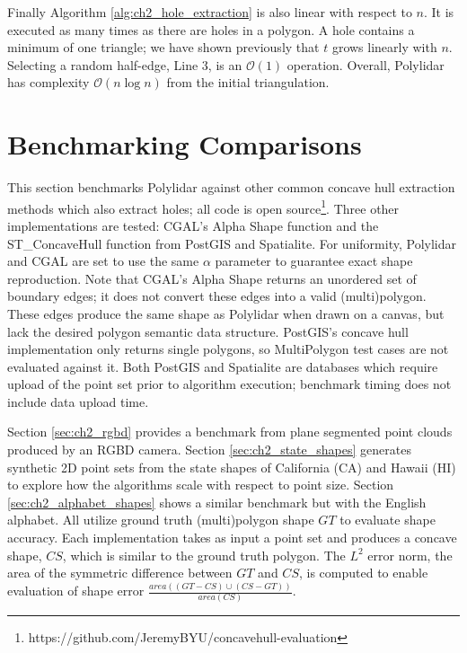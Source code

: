 Finally Algorithm \ref{alg:ch2_hole_extraction} is also linear with respect to $n$. It is executed as many times as there are holes in a polygon. A hole contains a minimum of one triangle; we have shown previously that $t$ grows linearly with $n$. Selecting a random half-edge, Line 3, is an $\mathcal{O}(1)$ operation. Overall, Polylidar has complexity $\mathcal{O}(n\log{}n)$ from the initial triangulation.

\section{Benchmarking Comparisons}\label{sec:ch2_results}

This section benchmarks Polylidar against other common concave hull extraction methods which also extract holes; all code is open source\footnote{https://github.com/JeremyBYU/concavehull-evaluation}. Three other implementations are tested: CGAL's Alpha Shape function and the ST\_ConcaveHull function from PostGIS and Spatialite. For uniformity, Polylidar and CGAL are set to use the same $\alpha$ parameter to guarantee exact shape reproduction. Note that CGAL's Alpha Shape returns an unordered set of boundary edges; it does not convert these edges into a valid (multi)polygon. These edges produce the same shape as Polylidar when drawn on a canvas, but lack the desired polygon semantic data structure. PostGIS's concave hull implementation only returns single polygons, so MultiPolygon test cases are not evaluated against it. Both PostGIS and Spatialite are databases which require upload of the point set prior to algorithm execution; benchmark timing does not include data upload time. 

Section \ref{sec:ch2_rgbd} provides a benchmark from plane segmented point clouds produced by an RGBD camera. Section \ref{sec:ch2_state_shapes} generates synthetic 2D point sets from the state shapes of California (CA) and Hawaii (HI) to explore how the algorithms scale with respect to point size.  Section \ref{sec:ch2_alphabet_shapes} shows a similar benchmark but with the English alphabet. All utilize ground truth (multi)polygon shape $GT$ to evaluate shape accuracy. 
Each implementation takes as input a point set and produces a concave shape, $CS$, which is similar to the ground truth polygon.  The $L^2$ error norm, the area of the symmetric difference between $GT$ and $CS$, is computed to enable evaluation of shape error $\frac{area((GT-CS) \cup (CS-GT))}{area(CS)}$. 

